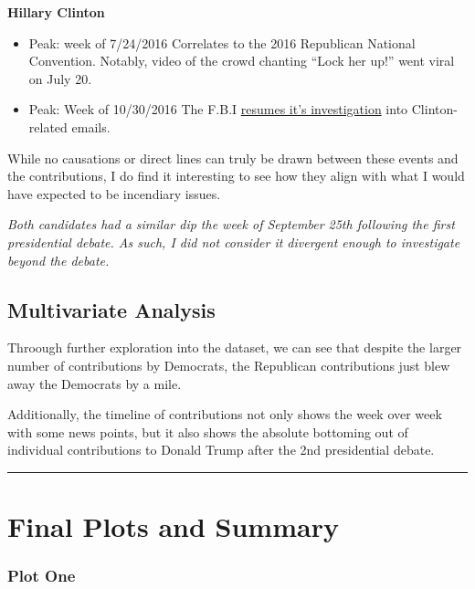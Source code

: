 \documentclass[]{article}
\providecommand{\tightlist}{%
  \setlength{\itemsep}{0pt}\setlength{\parskip}{0pt}}
\begin{document}
\textbf{Hillary Clinton}

\begin{itemize}
\tightlist
\item
  Peak: week of 7/24/2016 \textbar{} Correlates to the 2016 Republican
  National Convention. Notably, video of the crowd chanting ``Lock her
  up!'' went viral on July 20.
\item
  Peak: Week of 10/30/2016 \textbar{} The F.B.I
  \href{https://www.nytimes.com/2016/10/29/us/politics/fbi-hillary-clinton-email.html?module=inline}{resumes
  it's investigation} into Clinton-related emails.
\end{itemize}

While no causations or direct lines can truly be drawn between these
events and the contributions, I do find it interesting to see how they
align with what I would have expected to be incendiary issues.

\emph{Both candidates had a similar dip the week of September 25th
following the first presidential debate. As such, I did not consider it
divergent enough to investigate beyond the debate.}

\hypertarget{multivariate-analysis}{%
\subsection{Multivariate Analysis}\label{multivariate-analysis}}

Throough further exploration into the dataset, we can see that despite
the larger number of contributions by Democrats, the Republican
contributions just blew away the Democrats by a mile.

Additionally, the timeline of contributions not only shows the week over
week with some news points, but it also shows the absolute bottoming out
of individual contributions to Donald Trump after the 2nd presidential
debate.

\begin{center}\rule{0.5\linewidth}{\linethickness}\end{center}

\hypertarget{final-plots-and-summary}{%
\section{Final Plots and Summary}\label{final-plots-and-summary}}

\hypertarget{plot-one}{%
\subsubsection{Plot One}\label{plot-one}}
\end{document}
